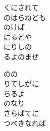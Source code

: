 \documentclass[10pt,b5j]{tarticle} %
\begin{document}
\begin{enumerate}
\begin{minipage}[c]{\blocksize}
        \vspace{\linespace}
        \item
        くにされて\\
        のはらねども\\
        のけば\\
        にるとや\\
        にりしの\\
        るよのませ
        
        \vspace{\linespace}
        \item
        のの\\
        りてしがに\\
        ちるよ\\
        のなり\\
        さらばてに\\
        つべきなれば
    
    \end{minipage}
\end{enumerate} %
\end{document}
